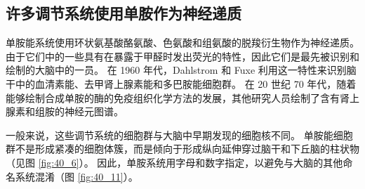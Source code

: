 \subsection{许多调节系统使用单胺作为神经递质}
单胺能系统使用环状氨基酸酪氨酸、色氨酸和组氨酸的脱羧衍生物作为神经递质。 由于它们中的一些具有在暴露于甲醛时发出荧光的特性，因此它们是最先被识别和绘制的大脑中的一员。 在 1960 年代，Dahlstrom 和 Fuxe 利用这一特性来识别脑干中的血清素能、去甲肾上腺素能和多巴胺能细胞群。 在 20 世纪 70 年代，随着能够绘制合成单胺的酶的免疫组织化学方法的发展，其他研究人员绘制了含有肾上腺素和组胺的神经元图谱。

一般来说，这些调节系统的细胞群与大脑中早期发现的细胞核不同。 单胺能细胞群不是形成紧凑的细胞体簇，而是倾向于形成纵向延伸穿过脑干和下丘脑的柱状物（见图 \ref{fig:40_6}）。 
因此，单胺系统用字母和数字指定，以避免与大脑的其他命名系统混淆（图 \ref{fig:40_11}）。

